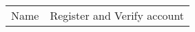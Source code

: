 \begin{table}[]
\begin{tabular}{ll}
Name             & Register and Verify account                                                                                                                                                                                                                                                                                                                                                                                                                                                                                                                                                                                                                                                                                                                                                                                                                                                                                                                                                                                                                                                                                                                                                                                                                                                                                                                                                                                                                                                                                                                                                                                                                                                                                                                                                                                                                                                                                                                                                                                                                            \\

\end{tabular}
\end{table}
